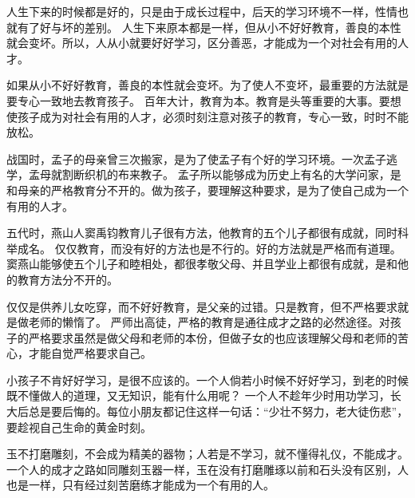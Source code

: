 \documentclass[avery5371,grid]{flashcards}
\begin{document}
\docshowcopyright
{}




{人生下来的时候都是好的，只是由于成长过程中，后天的学习环境不一样，性情也就有了好与坏的差别。} %
{人生下来原本都是一样，但从小不好好教育，善良的本性就会变坏。所以，人从小就要好好学习，区分善恶，才能成为一个对社会有用的人才。} %

{如果从小不好好教育，善良的本性就会变坏。为了使人不变坏，最重要的方法就是要专心一致地去教育孩子。} %
{百年大计，教育为本。教育是头等重要的大事。要想使孩子成为对社会有用的人才，必须时刻注意对孩子的教育，专心一致，时时不能放松。} %

{战国时，孟子的母亲曾三次搬家，是为了使孟子有个好的学习环境。一次孟子逃学，孟母就割断织机的布来教子。} %
{孟子所以能够成为历史上有名的大学问家，是和母亲的严格教育分不开的。做为孩子，要理解这种要求，是为了使自己成为一个有用的人才。} %

{五代时，燕山人窦禹钧教育儿子很有方法，他教育的五个儿子都很有成就，同时科举成名。} %
{仅仅教育，而没有好的方法也是不行的。好的方法就是严格而有道理。窦燕山能够使五个儿子和睦相处，都很孝敬父母、并且学业上都很有成就，是和他的教育方法分不开的。} %

{仅仅是供养儿女吃穿，而不好好教育，是父亲的过错。只是教育，但不严格要求就是做老师的懒惰了。} %
{严师出高徒，严格的教育是通往成才之路的必然途径。对孩子的严格要求虽然是做父母和老师的本份，但做子女的也应该理解父母和老师的苦心，才能自觉严格要求自己。} %

{小孩子不肯好好学习，是很不应该的。一个人倘若小时候不好好学习，到老的时候既不懂做人的道理，又无知识，能有什么用呢？} %
{一个人不趁年少时用功学习，长大后总是要后悔的。每位小朋友都记住这样一句话：“少壮不努力，老大徒伤悲”，要趁视自己生命的黄金时刻。} %

{玉不打磨雕刻，不会成为精美的器物；人若是不学习，就不懂得礼仪，不能成才。} %
{一个人的成才之路如同雕刻玉器一样，玉在没有打磨雕琢以前和石头没有区别，人也是一样，只有经过刻苦磨练才能成为一个有用的人。} %
\end{document}
